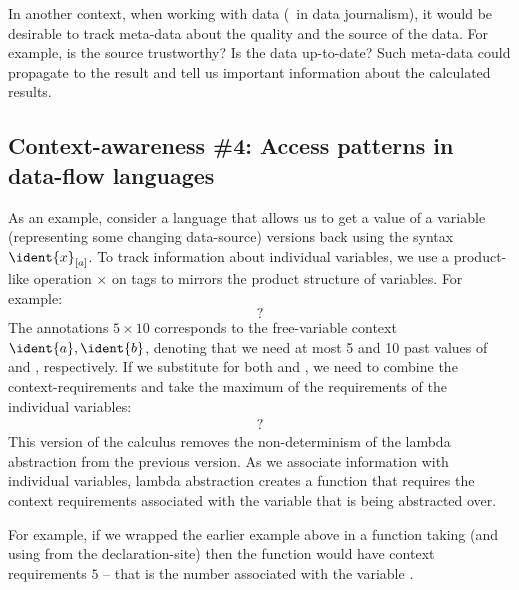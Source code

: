 In another context, when working with data (\eg~in data journalism), it would be desirable to 
track meta-data about the quality and the source of the data. For example, is the source trustworthy?
Is the data up-to-date? Such meta-data could propagate to the result and tell us important 
information about the calculated results.


\subsection{Context-awareness \#4: Access patterns in data-flow languages}

As an example, consider a language that allows us to get a value of a variable (representing
some changing data-source)  versions back using the syntax $\ident{x}_{[a]}$. 
To track information about individual variables, we use a product-like operation $\times$ on tags 
to mirrors the product structure of variables. For example:
%
\begin{equation*}
?
\end{equation*}
%
The annotations $5 \times 10$ corresponds to the free-variable context $\ident{a}, \ident{b}$, denoting
that we need at most 5 and 10 past values of  and , respectively. If we substitute 
 for both  and , we need to combine the context-requirements and take the
maximum of the requirements of the individual variables:
%
\begin{equation*}
\begin{array}{l}
?
\end{array}
\end{equation*}
%
This version of the calculus removes the non-determinism of the lambda abstraction from the previous
version. As we associate information with individual variables, lambda abstraction creates a function
that requires the context requirements associated with the variable that is being abstracted over.

For example, if we wrapped the earlier example above in a function taking  (and using 
 from the declaration-site) then the function would have context requirements $5$ -- that
is the number associated with the variable .


